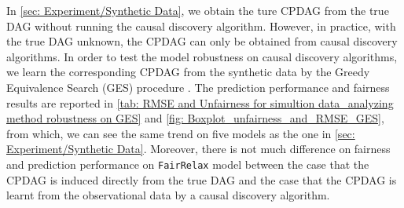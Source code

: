 \documentclass{article}
\begin{document}
In \cref{sec: Experiment/Synthetic Data}, we obtain the ture CPDAG from the true DAG without running the causal discovery algorithm. However, in practice, with the true DAG unknown, the CPDAG can only be obtained from causal discovery algorithms. In order to test the model robustness on causal discovery algorithms, we learn the corresponding CPDAG from the synthetic data by the Greedy Equivalence Search (GES) procedure \citep{chickering2002learning}. The prediction performance and fairness results are reported in \cref{tab: RMSE and Unfairness for simultion data_analyzing method robustness on GES} and \cref{fig: Boxplot_unfairness_and_RMSE_GES}, from which, we can see the same trend on five models as the one in \cref{sec: Experiment/Synthetic Data}. Moreover, there is not much difference on fairness and prediction performance on \texttt{FairRelax} model between the case that the CPDAG is induced directly from the true DAG and the case that the CPDAG is learnt from the observational data by a causal discovery algorithm.
\end{document}
